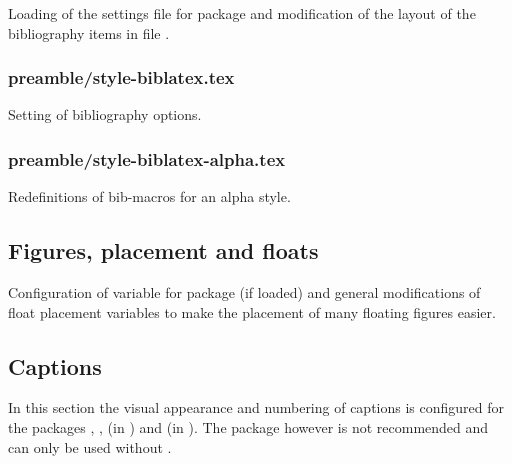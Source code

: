 Loading of the settings file  for package  and modification of the layout of the bibliography items in file .


\subsubsection{preamble/style-biblatex.tex}

Setting of bibliography options.


\subsubsection{preamble/style-biblatex-alpha.tex}

Redefinitions of bib-macros for an alpha style.


\subsection{Figures, placement and floats}
\label{sec:style:figures}

Configuration of variable for package  (if loaded) and 
general modifications of float placement variables to make the placement of 
many floating figures easier.


\subsection{Captions}
\label{sec:style:captions}

In this section the visual appearance and numbering of captions is configured 
for the packages , , 
 (in ) and  (in ). 
The package  however is not 
recommended and can only be used without .

